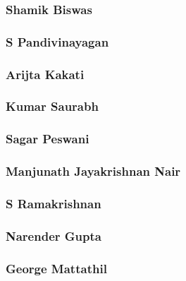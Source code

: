 \documentclass{article}
\begin{document}
\subsubsection{Shamik Biswas}


\subsubsection{S Pandivinayagan}


\subsubsection{Arijta Kakati}


\subsubsection{Kumar Saurabh}


\subsubsection{Sagar Peswani}


\subsubsection{Manjunath Jayakrishnan Nair}


\subsubsection{S Ramakrishnan}


\subsubsection{Narender Gupta}


\subsubsection{George Mattathil}

\end{document}
